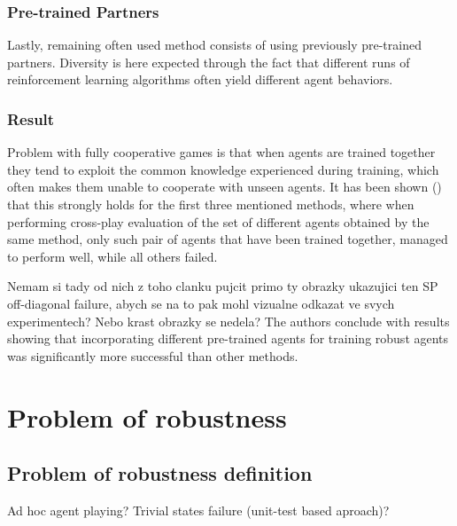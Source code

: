 \subsubsection*{Pre-trained Partners}
Lastly, remaining often used method consists of using previously pre-trained partners.
Diversity is here expected through the fact that different runs of reinforcement learning algorithms often yield different agent behaviors.


\subsubsection*{Result}
Problem with fully cooperative games is that when agents are trained together they tend to exploit the common knowledge experienced during training, which often makes them unable to cooperate with unseen agents.
It has been shown (\cite{10.1007/978-3-030-63823-8_46}) that this strongly holds for the first three mentioned methods, 
where when performing cross-play evaluation of the set of different agents obtained by the same method, 
only such pair of agents that have been trained together, managed to perform well, while all others failed.

{\color{blue} Nemam si tady od nich z toho clanku pujcit primo ty obrazky ukazujici ten SP off-diagonal failure, abych se na to pak mohl vizualne odkazat ve svych experimentech? 
Nebo krast obrazky se nedela?}
The authors conclude with results showing that incorporating different pre-trained agents for training robust agents was significantly more successful than other methods.


\section{Problem of robustness}


\subsection{Problem of robustness definition}
Ad hoc agent playing? Trivial states failure (unit-test based aproach)?








